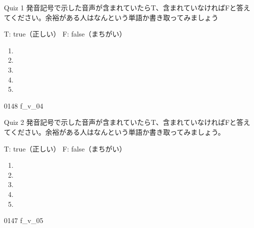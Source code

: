 \documentclass[aspectratio=169, xcolor={dvipsnames,table}]{beamer}
\begin{document}
\begin{frame}[plain]{Quiz 1 }
  \large 発音記号で示した音声が含まれていたらT、含まれていなければFと答えてください。余裕がある人はなんという単語か書き取ってみましょう

  \hfill{}{\scriptsize T: true（正しい）\hspace{5pt} F: false（まちがい）}
  \begin{enumerate}
    \item \mbox{}\hspace{1\zw}

    \item \mbox{}\hspace{1\zw}

    \item \mbox{}\hspace{1\zw}

    \item \mbox{}\hspace{1\zw}

    \item \mbox{}\hspace{1\zw}
  \end{enumerate}

  \hfill{\tiny 0148}\,{\scriptsize {}}\,{\tiny f\_v\_04}
\end{frame}
\begin{frame}[plain]{Quiz 2 }
  \large 発音記号で示した音声が含まれていたらT、含まれていなければFと答えてください。余裕がある人はなんという単語か書き取ってみましょう。

  \hfill{}{\scriptsize T: true（正しい）\hspace{5pt} F: false（まちがい）}
  \begin{enumerate}
    \item \mbox{}\hspace{1\zw}

    \item \mbox{}\hspace{1\zw}

    \item \mbox{}\hspace{1\zw}

    \item \mbox{}\hspace{1\zw}

    \item \mbox{}\hspace{1\zw}
  \end{enumerate}

  \hfill{\tiny 0147}\,{\scriptsize {}}\,{\tiny f\_v\_05}
\end{frame}
\end{document}
